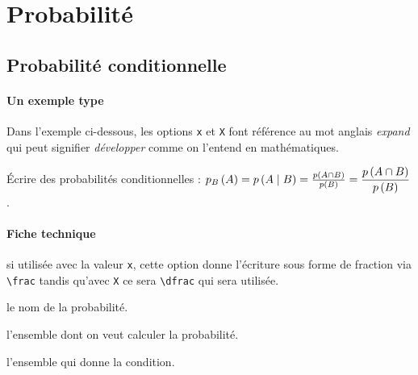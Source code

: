 \documentclass[12pt,a4paper]{article}
\begin{document}
\section{Probabilité}

    \subsection{Probabilité conditionnelle}

			\paragraph{Un exemple type}

Dans l'exemple ci-dessous, les options \texttt{x} et \texttt{X} font référence au mot anglais \emph{\og expand \fg} qui peut signifier \emph{\og développer \fg} comme on l'entend en mathématiques.

\begin{tcblisting}{}
Écrire des probabilités conditionnelles :
$\probacond{p}{A}{B} = \probacond*{p}{A}{B} 
                     = \probacond[x]{p}{A}{B} 
                     = \probacond[X]{p}{A}{B}$.
\end{tcblisting}


            \paragraph{Fiche technique}



\IDoption{} si utilisée avec la valeur \verb+x+, cette option donne l'écriture sous forme de fraction via \verb+\frac+ tandis qu'avec \verb+X+ ce sera \verb+\dfrac+ qui sera utilisée.

 le nom de la probabilité.

 l'ensemble dont on veut calculer la probabilité.

 l'ensemble qui donne la condition.
\end{document}
